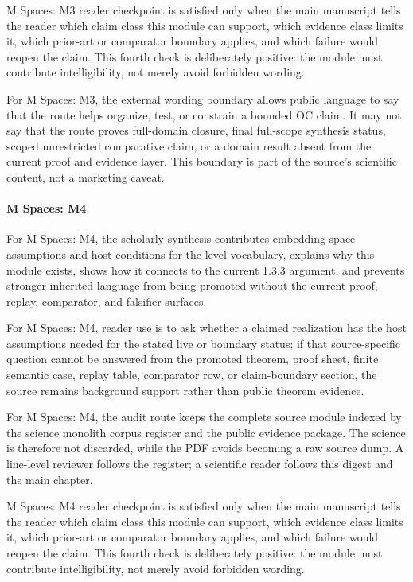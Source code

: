 M Spaces: M3 reader checkpoint is satisfied only when the main manuscript tells the reader which claim class this module can support, which evidence class limits it, which prior-art or comparator boundary applies, and which failure would reopen the claim. This fourth check is deliberately positive: the module must contribute intelligibility, not merely avoid forbidden wording.


For M Spaces: M3, the external wording boundary allows public language to say that the route helps organize, test, or constrain a bounded OC claim. It may not say that the route proves full-domain closure, final full-scope synthesis status, scoped unrestricted comparative claim, or a domain result absent from the current proof and evidence layer. This boundary is part of the source's scientific content, not a marketing caveat.


\paragraph{M Spaces: M4}

For M Spaces: M4, the scholarly synthesis contributes embedding-space assumptions and host conditions for the level vocabulary, explains why this module exists, shows how it connects to the current 1.3.3 argument, and prevents stronger inherited language from being promoted without the current proof, replay, comparator, and falsifier surfaces.


For M Spaces: M4, reader use is to ask whether a claimed realization has the host assumptions needed for the stated live or boundary status; if that source-specific question cannot be answered from the promoted theorem, proof sheet, finite semantic case, replay table, comparator row, or claim-boundary section, the source remains background support rather than public theorem evidence.


For M Spaces: M4, the audit route keeps the complete source module indexed by the science monolith corpus register and the public evidence package. The science is therefore not discarded, while the PDF avoids becoming a raw source dump. A line-level reviewer follows the register; a scientific reader follows this digest and the main chapter.


M Spaces: M4 reader checkpoint is satisfied only when the main manuscript tells the reader which claim class this module can support, which evidence class limits it, which prior-art or comparator boundary applies, and which failure would reopen the claim. This fourth check is deliberately positive: the module must contribute intelligibility, not merely avoid forbidden wording.


